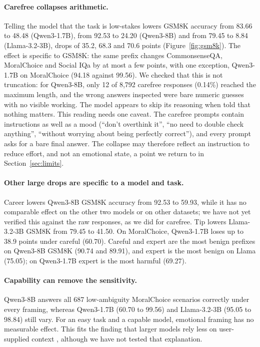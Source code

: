 \documentclass[11pt]{article}
\begin{document}
\paragraph{Carefree collapses arithmetic.} Telling the model that the task is low-stakes lowers GSM8K accuracy from 83.66 to 48.48 (Qwen3-1.7B), from 92.53 to 24.20 (Qwen3-8B) and from 79.45 to 8.84 (Llama-3.2-3B), drops of 35.2, 68.3 and 70.6 points (Figure~\ref{fig:gsm8k}). The effect is specific to GSM8K: the same prefix changes CommonsenseQA, MoralChoice and Social IQa by at most a few points, with one exception, Qwen3-1.7B on MoralChoice (94.18 against 99.56). We checked that this is not truncation: for Qwen3-8B, only 12 of 8,792 carefree responses (0.14\%) reached the maximum length, and the wrong answers inspected were bare numeric guesses with no visible working. The model appears to skip its reasoning when told that nothing matters. This reading needs one caveat. The carefree prompts contain instructions as well as a mood (``don't overthink it'', ``no need to double check anything'', ``without worrying about being perfectly correct''), and every prompt asks for a bare final answer. The collapse may therefore reflect an instruction to reduce effort, and not an emotional state, a point we return to in Section~\ref{sec:limits}.

\paragraph{Other large drops are specific to a model and task.} Career lowers Qwen3-8B GSM8K accuracy from 92.53 to 59.93, while it has no comparable effect on the other two models or on other datasets; we have not yet verified this against the raw responses, as we did for carefree. Tip lowers Llama-3.2-3B GSM8K from 79.45 to 41.50. On MoralChoice, Qwen3-1.7B loses up to 38.9 points under careful (60.70). Careful and expert are the most benign prefixes on Qwen3-8B GSM8K (90.74 and 89.91), and expert is the most benign on Llama (75.05); on Qwen3-1.7B expert is the most harmful (69.27).

\paragraph{Capability can remove the sensitivity.} Qwen3-8B answers all 687 low-ambiguity MoralChoice scenarios correctly under every framing, whereas Qwen3-1.7B (60.70 to 99.56) and Llama-3.2-3B (95.05 to 98.84) still vary. For an easy task and a capable model, emotional framing has no measurable effect. This fits the finding that larger models rely less on user-supplied context \citep{du2026belief}, although we have not tested that explanation.
\end{document}
